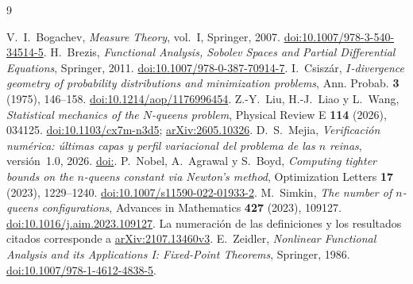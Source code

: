 \begin{thebibliography}{9}
\raggedright
{} V.~I.~Bogachev, \emph{Measure Theory}, vol.~I, Springer, 2007.
\href{https://doi.org/10.1007/978-3-540-34514-5}{doi:10.1007/978-3-540-34514-5}.
 H.~Brezis, \emph{Functional Analysis, Sobolev Spaces and Partial Differential
Equations}, Springer, 2011.
\href{https://doi.org/10.1007/978-0-387-70914-7}{doi:10.1007/978-0-387-70914-7}.
 I.~Csiszár, \emph{$I$-divergence geometry of probability distributions and
minimization problems}, Ann. Probab. \textbf{3} (1975), 146--158.
\href{https://doi.org/10.1214/aop/1176996454}{doi:10.1214/aop/1176996454}.
 Z.-Y.~Liu, H.-J.~Liao y L.~Wang, \emph{Statistical mechanics of the $N$-queens
problem}, Physical Review E \textbf{114} (2026), 034125.
\href{https://doi.org/10.1103/cx7m-n3d5}{doi:10.1103/cx7m-n3d5};
\href{https://arxiv.org/abs/2605.10326}{arXiv:2605.10326}.
\ifx\DOIcodigo\empty\else
{} D.~S.~Mejia, \emph{Verificación numérica: últimas capas y perfil variacional
del problema de las $n$ reinas}, versión~1.0, 2026.
\href{https://doi.org/\DOIcodigo}{doi:\DOIcodigo}.
\fi
{} P.~Nobel, A.~Agrawal y S.~Boyd, \emph{Computing tighter bounds on the $n$-queens
constant via Newton's method}, Optimization Letters \textbf{17} (2023), 1229--1240.
\href{https://doi.org/10.1007/s11590-022-01933-2}{doi:10.1007/s11590-022-01933-2}.
 M.~Simkin, \emph{The number of $n$-queens configurations}, Advances in Mathematics
\textbf{427} (2023), 109127.
\href{https://doi.org/10.1016/j.aim.2023.109127}{doi:10.1016/j.aim.2023.109127}. La numeración de las definiciones y los resultados citados corresponde
a \href{https://arxiv.org/abs/2107.13460v3}{arXiv:2107.13460v3}.
 E.~Zeidler, \emph{Nonlinear Functional Analysis and its Applications I:
Fixed-Point Theorems}, Springer, 1986.
\href{https://doi.org/10.1007/978-1-4612-4838-5}{doi:10.1007/978-1-4612-4838-5}.
\end{thebibliography}
